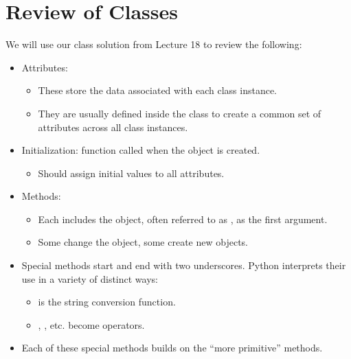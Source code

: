 \documentclass[letterpaper,10pt,english]{sphinxmanual}
\begin{document}
\section{Review of Classes}
\label{\detokenize{lecture_notes/lec19_classes2:review-of-classes}}
We will use our  class solution from Lecture 18 to review
the following:
\begin{itemize}
\item {} 
Attributes:
\begin{itemize}
\item {} 
These store the data associated with each class instance.

\item {} 
They are usually defined inside the class to create a common set
of attributes across all class instances.

\end{itemize}

\item {} 
Initialization: function  called when the object is
created.
\begin{itemize}
\item {} 
Should assign initial values to all attributes.

\end{itemize}

\item {} 
Methods:
\begin{itemize}
\item {} 
Each includes the object, often referred to as , as the
first argument.

\item {} 
Some change the object, some create new objects.

\end{itemize}

\item {} 
Special methods start and end with two underscores. Python interprets their
use in a variety of distinct ways:
\begin{itemize}
\item {} 
 is the string conversion function.

\item {} 
, , etc. become operators.

\end{itemize}

\item {} 
Each of these special methods builds on the “more primitive”
methods.

\end{itemize}
\end{document}
